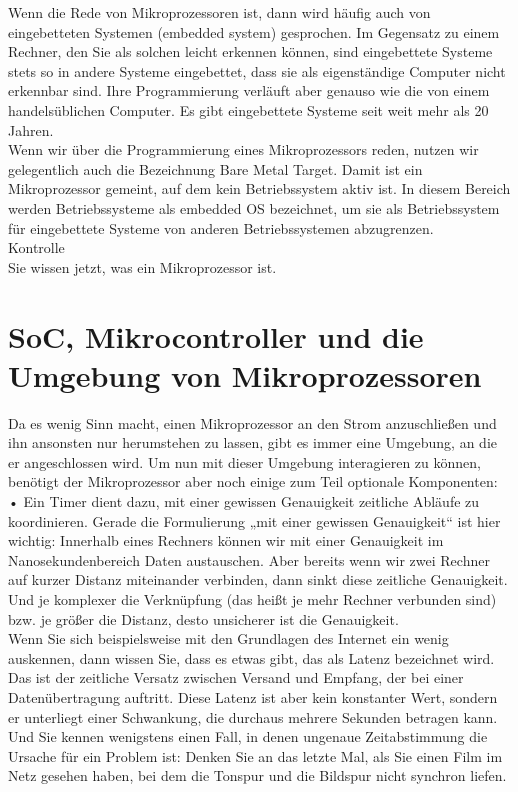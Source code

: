 Wenn die Rede von Mikroprozessoren ist, dann wird häufig auch von eingebetteten Systemen (embedded system) gesprochen. Im Gegensatz zu einem Rechner, den Sie als solchen leicht erkennen können, sind eingebettete Systeme stets so in andere Systeme eingebettet, dass sie als eigenständige Computer nicht erkennbar sind. Ihre Programmierung verläuft aber genauso wie die von einem handelsüblichen Computer. Es gibt eingebettete Systeme seit weit mehr als 20 Jahren.\\

Wenn wir über die Programmierung eines Mikroprozessors reden, nutzen wir gelegentlich auch die Bezeichnung Bare Metal Target. Damit ist ein Mikroprozessor gemeint, auf dem kein Betriebssystem aktiv ist. In diesem Bereich werden Betriebssysteme als embedded OS bezeichnet, um sie als Betriebssystem für eingebettete Systeme von anderen Betriebssystemen abzugrenzen.\\

Kontrolle\\

Sie wissen jetzt, was ein Mikroprozessor ist.

\section{SoC, Mikrocontroller und die Umgebung von Mikroprozessoren}

Da es wenig Sinn macht, einen Mikroprozessor an den Strom anzuschließen und ihn ansonsten nur herumstehen zu lassen, gibt es immer eine Umgebung, an die er angeschlossen wird. Um nun mit dieser Umgebung interagieren zu können, benötigt der Mikroprozessor aber noch einige zum Teil optionale Komponenten:\\

•	Ein Timer dient dazu, mit einer gewissen Genauigkeit zeitliche Abläufe zu koordinieren. Gerade die Formulierung „mit einer gewissen Genauigkeit“ ist hier wichtig: Innerhalb eines Rechners können wir mit einer Genauigkeit im Nanosekundenbereich Daten austauschen. Aber bereits wenn wir zwei Rechner auf kurzer Distanz miteinander verbinden, dann sinkt diese zeitliche Genauigkeit. Und je komplexer die Verknüpfung (das heißt je mehr Rechner verbunden sind) bzw. je größer die Distanz, desto unsicherer ist die Genauigkeit. \\

Wenn Sie sich beispielsweise mit den Grundlagen des Internet ein wenig auskennen, dann wissen Sie, dass es etwas gibt, das als Latenz bezeichnet wird. Das ist der zeitliche Versatz zwischen Versand und Empfang, der bei einer Datenübertragung auftritt. Diese Latenz ist aber kein konstanter Wert, sondern er unterliegt einer Schwankung, die durchaus mehrere Sekunden betragen kann. Und Sie kennen wenigstens einen Fall, in denen ungenaue Zeitabstimmung die Ursache für ein Problem ist: Denken Sie an das letzte Mal, als Sie einen Film im Netz gesehen haben, bei dem die Tonspur und die Bildspur nicht synchron liefen.\\

